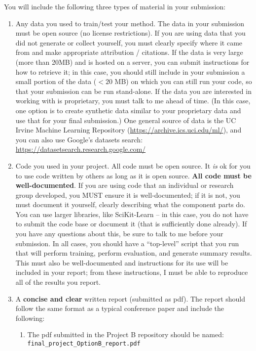 \documentclass[10pt]{article}
\begin{document}
You will include the following three types of material in your submission:
\begin{enumerate}
\item Any data you used to train/test your method. The data in your submission must be open source (no license restrictions). If you are using data that you did not generate or collect yourself, you must clearly specify where it came from and make appropriate attribution / citations. If the data is very large (more than 20MB) and is hosted on a server, you can submit instructions for how to retrieve it; in this case, you should still include in your submission a small portion of the data ($< 20$ MB) on which you can still run your code, so that your submission can be run stand-alone.  If the data you are interested in working with is proprietary, you must talk to me ahead of time.  (In this case, one option is to create synthetic data similar to your proprietary data and use that for your final submission.)
One general source of data is the UC Irvine Machine Learning Repository (\url{https://archive.ics.uci.edu/ml/}), and you can also use Google's datasets search: \url{https://datasetsearch.research.google.com/}
\item Code you used in your project.  All code must be open source.  It {\em is} ok for you to use code written by others as long as it is open source. {\bf All code must be well-documented}.  If you are using code that an individual or research group developed, you MUST ensure it is well-documented; if it is not, you must document it yourself, clearly describing what the component parts do.  You can use larger libraries, like SciKit-Learn -- in this case, you do not have to submit the code base or document it (that is sufficiently done already).  If you have any questions about this, be sure to talk to me before your submission.  In all cases, you should have a ``top-level'' script that you run that will perform training, perform evaluation, and generate summary results. This must also be well-documented and instructions for its use will be included in your report; from these instructions, I must be able to reproduce all of the results you report.
\item A {\bf concise and clear} written report (submitted as pdf). The report should follow the same format as a typical conference paper and include the following:
\begin{enumerate}
\item The pdf submitted in the Project B repository should be named: {\tt final\_project\_OptionB\_report.pdf}

\end{enumerate}
\end{enumerate}
\end{document}
